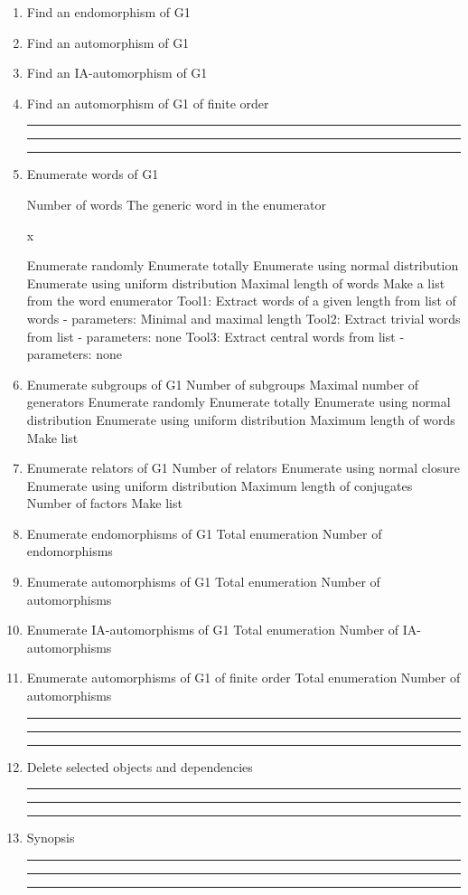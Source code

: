 \begin{enumerate}
\bigskip
\hrule\hrule\hrule

\item Find an endomorphism of G1

\item Find an automorphism of G1

\item Find an IA-automorphism of G1

\item Find an automorphism of G1 of finite order

\bigskip
\hrule\hrule\hrule
\item Enumerate words of G1

\subitem Number of words
\subsubitem The generic word in the enumerator

\hskip 2.0in    x

\subsubitem Enumerate randomly
\subsubitem Enumerate totally
\subsubitem Enumerate using normal distribution
\subsubitem Enumerate using uniform distribution
\subsubitem Maximal length of words
\bigskip
\subitem Make a list from the word enumerator
\subsubitem Tool1: Extract words of a given length
from list of words - parameters: Minimal and maximal length
\subsubitem Tool2: Extract trivial words from list - parameters: none
\subsubitem Tool3: Extract central words from list - parameters: none
\bigskip
\item Enumerate subgroups of G1
\subitem Number of subgroups
\subitem Maximal number of generators
\subsubitem Enumerate randomly
\subsubitem Enumerate totally
\subsubitem Enumerate using normal distribution
\subsubitem Enumerate using uniform distribution
\subsubitem Maximum length of words
\bigskip
\subitem Make list
\bigskip
\item Enumerate relators of G1
\subitem Number of relators
\subsubitem Enumerate using normal closure
\subsubitem Enumerate using uniform distribution
\subsubitem Maximum length of conjugates
\subsubitem Number of factors
\subitem Make list

\bigskip
\item Enumerate endomorphisms of G1
\subitem Total enumeration
\subsubitem Number of endomorphisms

 \bigskip
\item Enumerate automorphisms of G1
\subitem Total enumeration
\subsubitem Number of automorphisms

\bigskip
\item Enumerate IA-automorphisms of G1
\subitem Total enumeration
\subsubitem Number of IA-automorphisms

\bigskip
\item Enumerate automorphisms of G1 of finite order
\subitem Total enumeration \subsubitem Number of automorphisms
\bigskip
\hrule\hrule\hrule

\item Delete selected objects and dependencies

\bigskip
\hrule\hrule\hrule

\item
Synopsis

\bigskip
\hrule\hrule\hrule

\end{enumerate}
